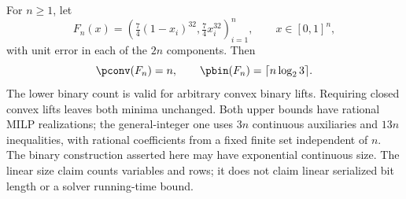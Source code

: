 \begin{theorem}\label{thm:exact-box-gap}
For $n\ge1$, let
\[
 F_n(x)=\left(\tfrac74(1-x_i)^{32},\tfrac74x_i^{32}\right)_{i=1}^n,
 \qquad x\in[0,1]^n,
\]
with unit error in each of the $2n$ components. Then
\begin{equation}\label{eq:exact-box-counts}
 \pconv(F_n)=n,\qquad \pbin(F_n)=\lceil n\log_2 3\rceil.
\end{equation}
The lower binary count is valid for arbitrary convex binary lifts.
Requiring closed convex lifts leaves both minima unchanged.
Both upper bounds have rational MILP realizations; the general-integer
one uses $3n$ continuous auxiliaries and $13n$ inequalities, with rational
coefficients from a fixed finite set independent of $n$. The binary
construction asserted here may have exponential continuous size.
The linear size claim counts variables and rows; it does not claim
linear serialized bit length or a solver running-time bound.
\end{theorem}
